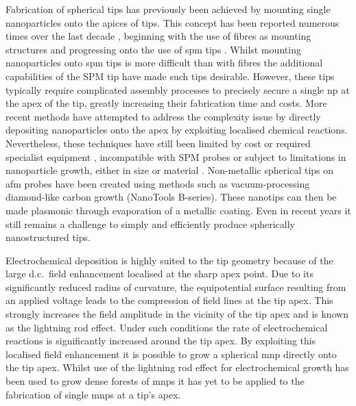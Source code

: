 \documentclass[12pt, a4paper, oneside]{book}
\begin{document}
Fabrication of spherical tips has previously been achieved by mounting single nanoparticles onto the apices of tips. This concept has been reported numerous times over the last decade \cite{gan2007}, beginning with the use of fibres as mounting structures \cite{kalkbrenner2001, barsegova2002, sqalli2002, kawata2003} and progressing onto the use of \gls{spm} tips \cite{umakoshi2012, hayazawa2012, park2012, okamoto2001, vakarelski2006}. Whilst mounting nanoparticles onto \gls{spm} tips is more difficult than with fibres the additional capabilities of the SPM tip have made such tips desirable. However, these tips typically require complicated assembly processes to precisely secure a single \gls{np} at the apex of the tip, greatly increasing their fabrication time and costs. More recent methods have attempted to address the complexity issue by directly depositing nanoparticles onto the apex by exploiting localised chemical reactions. Nevertheless, these techniques have still been limited by cost or required specialist equipment \cite{sqalli2002, okamoto2001}, incompatible with SPM probes \cite{kharintsev2013, barsegova2002} or subject to limitations in nanoparticle growth, either in size \cite{cheng2013} or material \cite{umakoshi2012}.
Non-metallic spherical tips on \gls{afm} probes have been created using methods such as vacuum-processing diamond-like carbon growth (NanoTools B-series). These nanotips can then be made plasmonic through evaporation of a metallic coating.
Even in recent years it still remains a challenge to simply and efficiently produce spherically nanostructured tips.

Electrochemical deposition is highly suited to the tip geometry because of the large d.c.\ field enhancement localised at the sharp apex point. Due to its significantly reduced radius of curvature, the equipotential surface resulting from an applied voltage leads to the compression of field lines at the tip apex. This strongly increases the field amplitude in the vicinity of the tip apex and is known as the lightning rod effect. Under such conditions the rate of electrochemical reactions is significantly increased around the tip apex. By exploiting this localised field enhancement it is possible to grow a spherical \gls{mnp} directly onto the tip apex. Whilst use of the lightning rod effect for electrochemical growth has been used to grow dense forests of \glspl{mnp} \cite{tian2006, yang2011} it has yet to be applied to the fabrication of single \glspl{mnp} at a tip's apex.
\end{document}
